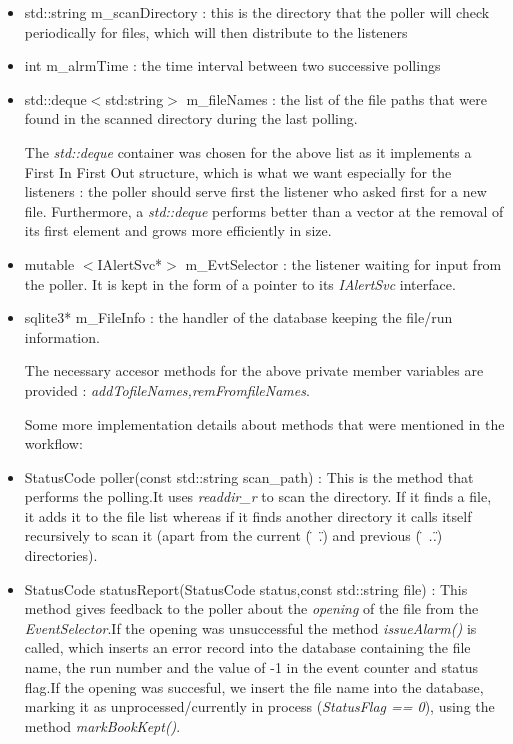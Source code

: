 \begin{itemize}

\item std::string m\_scanDirectory : this is the directory that the poller will check periodically for files, which will then distribute to the listeners\par
\item int m\_alrmTime : the time interval between two successive pollings\par
\item std::deque$<$std:string$>$ m\_fileNames : the list of the file paths that were found in the scanned directory during the last polling.\par 
\bigskip\noindent
The \textit{std::deque} container was chosen for the above list as it implements a First In First Out structure, which is what we want especially for the listeners : the poller should serve first the listener who asked first for a new file. Furthermore, a  \textit{std::deque} performs better than a vector at the removal of its first element and grows more efficiently in size.\par
\bigskip\noindent
\item mutable $<$IAlertSvc*$>$ m\_EvtSelector : the listener waiting for input from the poller. It is kept in the form of a pointer to its \textit{IAlertSvc} interface.\par
\item sqlite3* m\_FileInfo : the handler of the database keeping the file/run information.\par
\bigskip\noindent
The necessary accesor methods for the above private member variables are provided : \textit{addTofileNames,remFromfileNames}.\par
Some more implementation details about methods that were mentioned in the workflow:\par
\item StatusCode poller(const std::string scan\_path) : This is the method that performs the polling.It uses \textit{readdir\_r} to scan the directory. If it finds a file, it adds it to the file list whereas if it finds another directory it calls itself recursively to scan it (apart from the current (\textit{\"~.\"}) and previous  (\textit{\"~..\"}) directories).\par
\item StatusCode statusReport(StatusCode status,const std::string file) : This method gives feedback to the poller about the \textit{opening} of the file from the \textit{EventSelector}.If the opening was unsuccessful the method \textit{issueAlarm()} is called, which inserts an error record into the database containing the file name, the run number and the value of -1 in the event counter and status flag.If the opening was succesful, we insert the file name into the database, marking it as unprocessed/currently in process (\textit{StatusFlag == 0}), using the method \textit{markBookKept()}.\par

\end{itemize}
